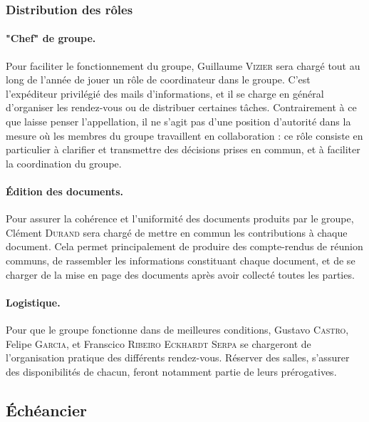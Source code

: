 \documentclass[a4paper, 12pt,twoside]{article}
\begin{document}
		\subsubsection{Distribution des rôles}
		
		\paragraph{"Chef" de groupe. } Pour faciliter le fonctionnement du groupe, \textcolor{bleu303}{Guillaume \textsc{Vizier}} sera chargé tout au long de l'année de jouer un rôle de coordinateur dans le groupe. C'est l'expéditeur privilégié des mails d'informations, et il se charge en général d'organiser les rendez-vous ou de distribuer certaines tâches. Contrairement à ce que laisse penser l'appellation, il ne s'agit pas d'une position d'autorité dans la mesure où les membres du groupe travaillent en collaboration : ce rôle consiste en particulier à clarifier et transmettre des décisions prises en commun, et à faciliter la coordination du groupe.
		
		\paragraph{Édition des documents. } Pour assurer la cohérence et l'uniformité des documents produits par le groupe, \textcolor{bleu303}{Clément \textsc{Durand}} sera chargé de mettre en commun les contributions à chaque document. Cela permet principalement de produire des compte-rendus de réunion communs, de rassembler les informations constituant chaque document, et de se charger de la mise en page des documents après avoir collecté toutes les parties.
		
		\paragraph{Logistique. } Pour que le groupe fonctionne dans de meilleures conditions, \textcolor{bleu303}{Gustavo \textsc{Castro}}, \textcolor{bleu303}{Felipe \textsc{Garcia}}, et \textcolor{bleu303}{Franscico \textsc{Ribeiro Eckhardt Serpa}} se chargeront de l'organisation pratique des différents rendez-vous. Réserver des salles, s'assurer des disponibilités de chacun, feront notamment partie de leurs prérogatives.
	
	\subsection{Échéancier}
	
\end{document}
